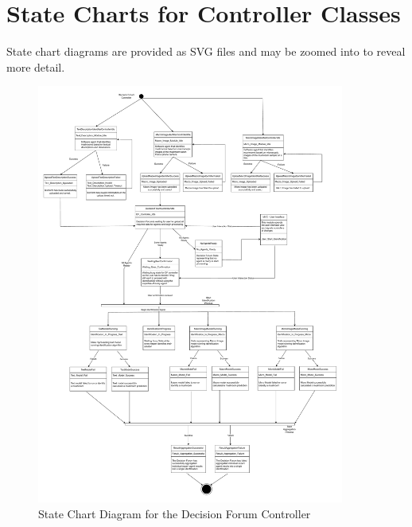 \documentclass[]{article}
\begin{document}
\newpage

\section{State Charts for Controller Classes}

State chart diagrams are provided as SVG files and may be zoomed into to reveal more detail.
\label{sec:state_charts_for_controller_classes}

\begin{figure}[H]
    \centering
    \includegraphics[width=0.9\textwidth]{SE3A04_D3_Diagram_Omar-Page-1.drawio.pdf}
    \caption{State Chart Diagram for the Decision Forum Controller}
\end{figure}
\end{document}
